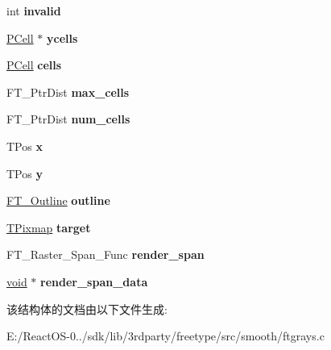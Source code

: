 \begin{DoxyCompactItemize}
\item 
\mbox{\label{structgray___t_worker___a9e4c0a1f25d45cc3cff715c8b0684dfb}} 
int {\bfseries invalid}
\item 
\mbox{\label{structgray___t_worker___ac13e1a0a76566de7db8e8806b18c8bbe}} 
\hyperlink{struct_t_cell__}{P\+Cell} $\ast$ {\bfseries ycells}
\item 
\mbox{\label{structgray___t_worker___a155d0bf41305a54988cff080c197c7bb}} 
\hyperlink{struct_t_cell__}{P\+Cell} {\bfseries cells}
\item 
\mbox{\label{structgray___t_worker___a1c9dd9f509927750ee2303798b0bb1f4}} 
F\+T\+\_\+\+Ptr\+Dist {\bfseries max\+\_\+cells}
\item 
\mbox{\label{structgray___t_worker___ac031bcff9c87b94eb422966de5d8b761}} 
F\+T\+\_\+\+Ptr\+Dist {\bfseries num\+\_\+cells}
\item 
\mbox{\label{structgray___t_worker___a7b2014f7166986b660d76138582121ab}} 
T\+Pos {\bfseries x}
\item 
\mbox{\label{structgray___t_worker___a0ddbe81b4ee5afb1f40639008a906d61}} 
T\+Pos {\bfseries y}
\item 
\mbox{\label{structgray___t_worker___ac24dce6af23f6ef441105354fb5bbfce}} 
\hyperlink{struct_f_t___outline__}{F\+T\+\_\+\+Outline} {\bfseries outline}
\item 
\mbox{\label{structgray___t_worker___ade80e80c0de275b28cd00a1f7e027935}} 
\hyperlink{struct_t_pixmap__}{T\+Pixmap} {\bfseries target}
\item 
\mbox{\label{structgray___t_worker___a2864c17bb098262b929d7d2a80d2afda}} 
F\+T\+\_\+\+Raster\+\_\+\+Span\+\_\+\+Func {\bfseries render\+\_\+span}
\item 
\mbox{\label{structgray___t_worker___ad12de3bbfd564ac57761ba98d7dc8dab}} 
\hyperlink{interfacevoid}{void} $\ast$ {\bfseries render\+\_\+span\+\_\+data}
\end{DoxyCompactItemize}


该结构体的文档由以下文件生成\+:\begin{DoxyCompactItemize}
\item 
E\+:/\+React\+O\+S-\/0../sdk/lib/3rdparty/freetype/src/smooth/ftgrays.\+c\end{DoxyCompactItemize}
